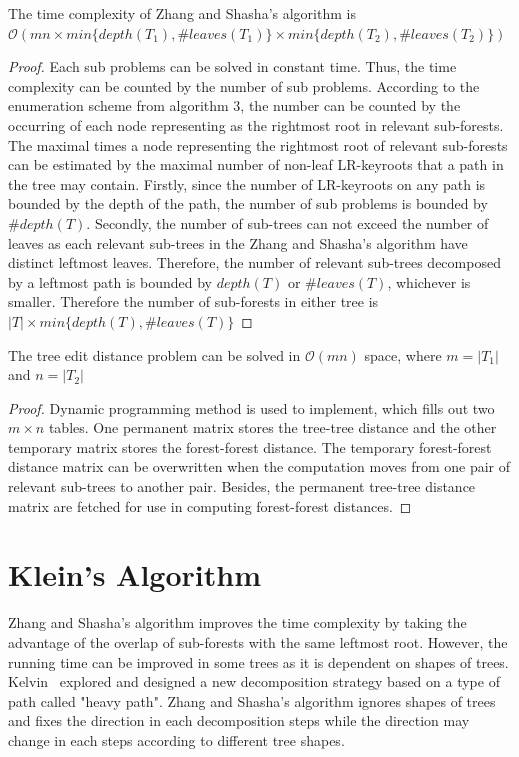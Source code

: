 \begin{lemma}
The time complexity of Zhang and Shasha's algorithm is $\mathcal{O}(mn \times min\{depth(T_1), \#leaves(T_1)\} \times min\{depth(T_2), \#leaves(T_2)\})$
\end{lemma}
\begin{proof}
Each sub problems can be solved in constant time. Thus, the time complexity can be counted by the number of sub problems. According to the enumeration scheme from algorithm 3, the number can be counted by the occurring of each node representing as the rightmost root in relevant sub-forests. The maximal times a node representing the rightmost root of relevant sub-forests can be estimated by the maximal number of non-leaf LR-keyroots that a path in the tree may contain. Firstly, since the number of LR-keyroots on any path is bounded by the depth of the path, the number of sub problems is bounded by $\#depth(T)$. Secondly, the number of sub-trees can not exceed the number of leaves as each relevant sub-trees in the Zhang and Shasha's algorithm have distinct leftmost leaves. Therefore, the number of relevant sub-trees decomposed by a leftmost path is bounded by $depth(T)$ or $\#leaves(T)$, whichever is smaller. Therefore the number of sub-forests in either tree is $\left\vert T \right\vert \times min\{depth(T), \#leaves(T)\}$  
\end{proof}
\begin{lemma}
The tree edit distance problem can be solved in $\mathcal{O}(mn)$ space, where $m=\left\vert T_1 \right\vert$ and $n=\left\vert T_2 \right\vert$
\end{lemma}
\begin{proof}
Dynamic programming method is used to implement, which fills out two $m \times n$ tables. One permanent matrix stores the tree-tree distance and the other temporary matrix stores the forest-forest distance. The temporary forest-forest distance matrix can be overwritten when the computation moves from one pair of relevant sub-trees to another pair. Besides, the permanent tree-tree distance matrix are fetched for use in computing forest-forest distances.
\end{proof}
\section{Klein's Algorithm}
Zhang and Shasha's algorithm improves the time complexity by taking the advantage of the overlap of  sub-forests with the same leftmost root. However, the running time can be improved in some trees as it is dependent on shapes of trees. Kelvin~\cite{klein1998computing} explored and designed a new decomposition strategy based on a type of path called "heavy path". Zhang and Shasha's algorithm ignores shapes of trees and fixes the direction in each decomposition steps while the direction may change in each steps according to different tree shapes. 

